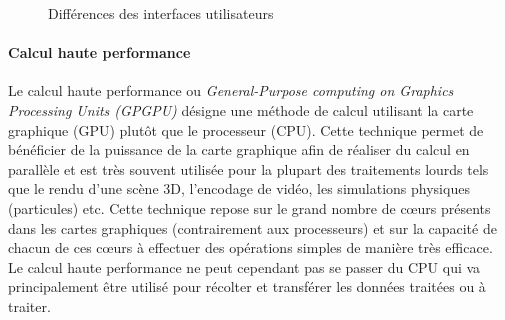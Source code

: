 \begin{figure}[H]
    \centering
\caption{Différences des interfaces utilisateurs}
\label{fig:GUITUI}
\end{figure}

\paragraph{Calcul haute performance}
Le calcul haute performance ou \emph{General-Purpose computing on Graphics Processing Units (GPGPU)} désigne une méthode de calcul utilisant la carte graphique (GPU) plutôt que le processeur (CPU). Cette technique permet de bénéficier de la puissance de la carte graphique afin de réaliser du calcul en parallèle et est très souvent utilisée pour la plupart des traitements lourds tels que le rendu d'une scène 3D, l'encodage de vidéo, les simulations physiques (particules) etc. Cette technique repose sur le grand nombre de cœurs présents dans les cartes graphiques (contrairement aux processeurs) et sur la capacité de chacun de ces cœurs à effectuer des opérations simples de manière très efficace. Le calcul haute performance ne peut cependant pas se passer du CPU qui va principalement être utilisé pour récolter et transférer les données traitées ou à traiter.

